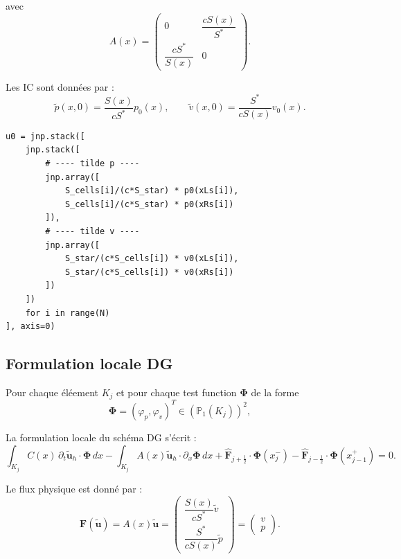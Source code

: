 \documentclass[12pt,a4paper]{article}
\begin{document}
avec
\begin{equation}
A(x) =
\begin{pmatrix}
0 & \dfrac{c S(x)}{ S^\ast} \\
\dfrac{c S^\ast}{S(x)} & 0
\end{pmatrix}.
\end{equation}

Les IC sont données par : 
\begin{equation}
\tilde{p}(x,0) = \frac{S(x)}{c S^\ast} p_0(x), 
\qquad 
\tilde{v}(x,0) = \frac{S^\ast}{c S(x)} v_0(x).
\end{equation}

\newpage
\begin{verbatim}
u0 = jnp.stack([
    jnp.stack([
        # ---- tilde p ----
        jnp.array([
            S_cells[i]/(c*S_star) * p0(xLs[i]),
            S_cells[i]/(c*S_star) * p0(xRs[i])
        ]),
        # ---- tilde v ----
        jnp.array([
            S_star/(c*S_cells[i]) * v0(xLs[i]),
            S_star/(c*S_cells[i]) * v0(xRs[i])
        ])
    ])
    for i in range(N)
], axis=0)
\end{verbatim}

\subsection{Formulation locale DG}

Pour chaque éléement $K_j$ et pour chaque test function $\boldsymbol{\Phi}$ de la forme
\begin{equation}
\boldsymbol{\Phi} = (\varphi_p, \varphi_v)^T \in (\mathbb{P}_1(K_j))^2,
\end{equation}

La formulation locale du schéma DG s'écrit :
\begin{equation}
\int_{K_j} C(x)\, \partial_t \mathbf{\tilde{u}}_h \cdot \boldsymbol{\Phi}\, dx
-
\int_{K_j} A(x)\mathbf{\tilde{u}}_h \cdot \partial_x \boldsymbol{\Phi}\, dx
+
\widehat{\mathbf{F}}_{j+\frac12} \cdot \boldsymbol{\Phi}(x_j^-)
-
\widehat{\mathbf{F}}_{j-\frac12} \cdot \boldsymbol{\Phi}(x_{j-1}^+)
= 0.
\end{equation}

Le flux physique est donné par :
\begin{equation}
\mathbf{F}(\mathbf{\tilde{u}}) = A(x)\mathbf{\tilde{u}} =
\begin{pmatrix}
\dfrac{S(x)}{c S^*} \tilde{v} \\
\dfrac{S^*}{c S(x)} \tilde{p}
\end{pmatrix}
=
\begin{pmatrix}
v \\
p
\end{pmatrix}.
\end{equation}
\end{document}
